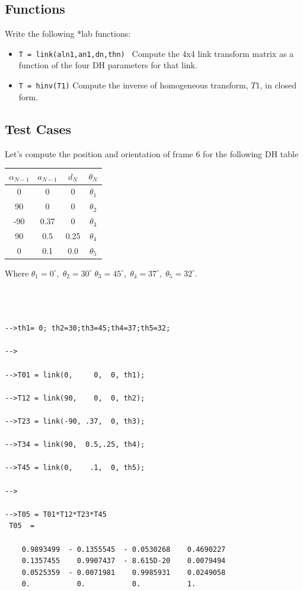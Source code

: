 \documentclass{article}
\begin{document}
\subsection{Functions}
Write the following *lab functions:

\begin{itemize}
  \item {\tt T = link(aln1,an1,dn,thn) }	Compute the 4x4 link transform matrix as a function of the four DH parameters for that link.
  \item {\tt T = hinv(T1)}			Compute the inverse of homogeneous transform, $T1$, in closed form.
\end{itemize}



\subsection{Test Cases}

Let's compute the position and orientation of frame 6 for the following DH table

\vspace{0.1in}
\begin{tabular}{|c|c|c|c|} \hline
$\alpha_{N-1}$	& $a_{N-1}$ 	& $d_N$	&	$\theta_N$	\\ \hline
0		& 0		& 0	& 	$\theta_1$	\\ \hline
90		& 0		& 0	& 	$\theta_2$	\\ \hline
-90		& 0.37		& 0	&	$\theta_3$	\\ \hline
90		& 0.5		& 0.25	&       $\theta_4$	\\ \hline
0		& 0.1		& 0.0	& 	$\theta_5$	\\ \hline
\end{tabular}
\vspace{0.1in}

Where $\theta_1=0^\circ,\; \theta_2=30^\circ\; \theta_3=45^\circ, \; \theta_4 = 37^\circ,\; \theta_5=32^\circ$.

\begin{verbatim}



-->th1= 0; th2=30;th3=45;th4=37;th5=32;

-->

-->T01 = link(0,     0,  0, th1);

-->T12 = link(90,    0,  0, th2);

-->T23 = link(-90, .37,  0, th3);

-->T34 = link(90,  0.5,.25, th4);

-->T45 = link(0,    .1,  0, th5);

-->

-->T05 = T01*T12*T23*T45
 T05  =

    0.9893499  - 0.1355545  - 0.0530268    0.4690227
    0.1357455    0.9907437  - 8.615D-20    0.0079494
    0.0525359  - 0.0071981    0.9985931    0.0249058
    0.           0.           0.           1.


\end{verbatim}
\end{document}
